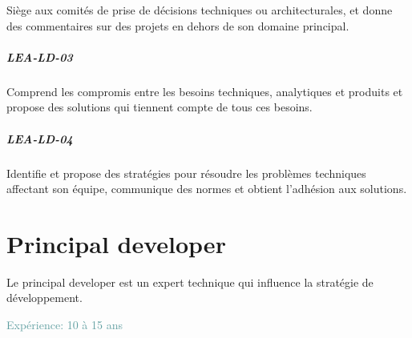 \documentclass[a4paper, french, openany, 12pt]{book}
\newcommand\cha[1]{\textcolor{OliveGreen}{\textbf{\uppercase{lea-{#1}}}}}
\newcommand\xp[1]{\textcolor{CadetBlue}{Expérience: {#1} ans}}
\begin{document}
\begin{multicols}{2}
  Siège aux comités de prise de décisions techniques ou architecturales, et donne des commentaires sur des projets en 
  dehors de son domaine principal.
  
  \paragraph*{\cha{ld-03}}

  Comprend les compromis entre les besoins techniques, analytiques et produits et propose des solutions qui tiennent 
  compte de tous ces besoins.

  \paragraph*{\cha{ld-04}}

  Identifie et propose des stratégies pour résoudre les problèmes techniques affectant son équipe, communique des normes 
  et obtient l'adhésion aux solutions.

\end{multicols}

\chapter{Principal developer}

Le principal developer est un expert technique qui influence la stratégie de développement.

\xp{10 à 15}
\end{document}
